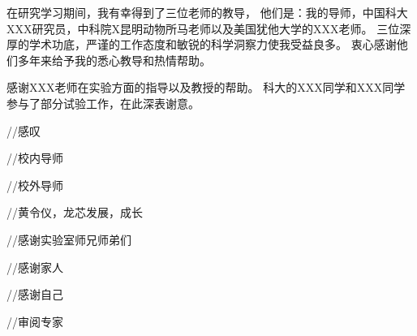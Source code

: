 
\begin{acknowledgements}

在研究学习期间，我有幸得到了三位老师的教导，
他们是：我的导师，中国科大XXX研究员，中科院X昆明动物所马老师以及美国犹他大学的XXX老师。
三位深厚的学术功底，严谨的工作态度和敏锐的科学洞察力使我受益良多。
衷心感谢他们多年来给予我的悉心教导和热情帮助。

感谢XXX老师在实验方面的指导以及教授的帮助。
科大的XXX同学和XXX同学参与了部分试验工作，在此深表谢意。

//感叹

//校内导师

//校外导师

//黄令仪，龙芯发展，成长

//感谢实验室师兄师弟们

//感谢家人

//感谢自己

//审阅专家

\end{acknowledgements}
